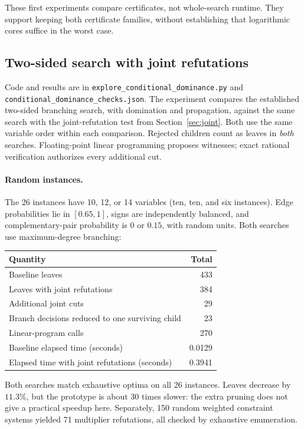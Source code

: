\documentclass[11pt,a4paper]{article}
\theoremstyle{definition}
\theoremstyle{remark}
\begin{document}
These first experiments compare certificates, not whole-search runtime.
They support keeping both certificate families, without establishing
that logarithmic cores suffice in the worst case.

\subsection{Two-sided search with joint refutations}

Code and results are in
{\small\nolinkurl{explore_conditional_dominance.py}} and
{\small\nolinkurl{conditional_dominance_checks.json}}. The experiment compares the established
two-sided branching search, with domination and propagation, against
the same search with the joint-refutation test from
Section~\ref{sec:joint}. Both use the same variable order within each
comparison. Rejected children count as leaves in \emph{both} searches.
Floating-point linear programming proposes witnesses; exact rational
verification authorizes every additional cut.

\paragraph{Random instances.}
The 26 instances have 10, 12, or 14 variables (ten, ten, and six instances).
Edge probabilities lie in $[0.65,1]$, signs are independently balanced,
and complementary-pair probability is $0$ or $0.15$, with random units.
Both searches use maximum-degree branching:
\begin{center}
\begin{tabular}{lr}
\toprule
Quantity & Total\\
\midrule
Baseline leaves & 433\\
Leaves with joint refutations & 384\\
Additional joint cuts & 29\\
Branch decisions reduced to one surviving child & 23\\
Linear-program calls & 270\\
Baseline elapsed time (seconds) & 0.0129\\
Elapsed time with joint refutations (seconds) & 0.3941\\
\bottomrule
\end{tabular}
\end{center}
Both searches match exhaustive optima on all 26 instances. Leaves decrease
by $11.3\%$, but the prototype is about 30 times slower: the extra pruning
does not give a practical speedup here. Separately, 150 random weighted
constraint systems yielded 71 multiplier refutations, all checked by
exhaustive enumeration.
\end{document}
